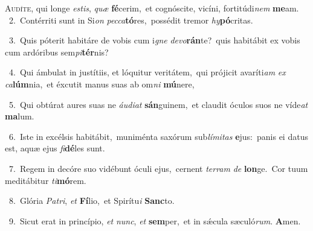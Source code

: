 \lettrine{\initial\textcolor{\initialcolor}{A}}{udíte,} qui longe \textit{es}\-\textit{tis}, \textit{quæ} \textbf{fé}\-cerim,~\star et cognóscite, vicíni, fortitúdi\textit{nem} \textbf{me}\-am.\\
{\numbfont\textcolor{\numbcolor}{~2.}}~Contérriti sunt in Si\textit{on} \textit{pec}\-\textit{ca}\textbf{tó}res,~\star possédit tremor \textit{hy}\-\textbf{pó}critas.\par
{\numbfont\textcolor{\numbcolor}{~3.}}~Quis póterit habitáre de vobis cum i\textit{gne} \textit{de}\-\textit{vo}\textbf{rán}te?~\star quis habitábit ex vobis cum ardóribus sem\-\textit{pi}\-\textbf{tér}nis?\par
{\numbfont\textcolor{\numbcolor}{~4.}}~Qui ámbulat in justítiis, et lóquitur veritátem,~\dagger qui prójicit avaríti\textit{am} \textit{ex} \textit{ca}\-\textbf{lúm}nia,~\star et éxcutit manus suas ab om\textit{ni} \textbf{mú}\-nere,\par
{\numbfont\textcolor{\numbcolor}{~5.}}~Qui obtúrat aures suas ne \textit{áu}\-\textit{di}\textit{at} \textbf{sán}\-guinem,~\star et claudit óculos suos ne víde\textit{at} \textbf{ma}\-lum.\par
{\numbfont\textcolor{\numbcolor}{~6.}}~Iste in excélsis habitábit,~\dagger muniménta saxórum sub\-\textit{lí}\-\textit{mi}\textit{tas} \textbf{e}\-jus:~\star panis ei datus est, aquæ ejus \textit{fi}\-\textbf{dé}les sunt.\par
{\numbfont\textcolor{\numbcolor}{~7.}}~Regem in decóre suo vidébunt óculi ejus,~\dagger cernent \textit{ter}\-\textit{ram} \textit{de} \textbf{lon}\-ge.~\star Cor tuum meditábitur \textit{ti}\-\textbf{mó}rem.\par
{\numbfont\textcolor{\numbcolor}{~8.}}~Glória \textit{Pa}\-\textit{tri}, \textit{et} \textbf{Fí}\-lio,~\star et Spirítu\textit{i} \textbf{Sanc}\-to.\par
{\numbfont\textcolor{\numbcolor}{~9.}}~Sicut erat in princípio, \textit{et} \textit{nunc}\-, \textit{et} \textbf{sem}\-per,~\star et in sǽcula sæculó\-\textit{rum}\-. \textbf{A}\-men.\par
